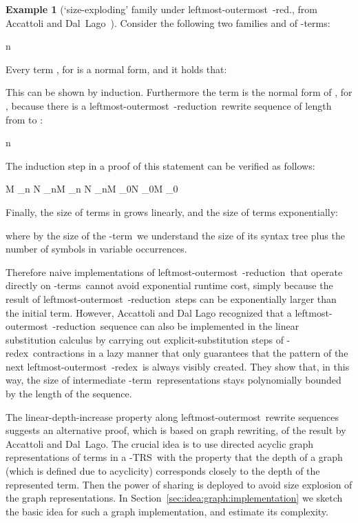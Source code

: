 \documentclass[
submission
]{dmtcs-episciences-tampered}
\newcommand{\indap}[2]{#1 _{#2}}
\newcommand{\bpap}[3]{#1 _{#2}^{#3}}
\newcommand{\nb}{\nobreakdash}
\newcommand{\nf}{\normalfont}
\newcommand{\nat}{\mathbb{N}}
\newcommand{\TRS}{TRS}
\newcommand{\alter}{M}
\newcommand{\blter}{N}
\newcommand{\alteri}{\indap{\alter}}
\newcommand{\blteri}{\indap{\blter}}
\newcommand{\sred}{\to}
\newcommand{\sredin}[2]{\bpap{\sred}{#1}{#2}}
\newcommand{\scriptlobeta}{\text{\nf lo}\beta}
\newcommand{\slobetaredn}{\sredin{\scriptlobeta}}
\newcommand{\lobetaredn}[1]{\mathrel{\slobetaredn{#1}}}
\newcommand{\lambdaterm}{\nb-term}
\newcommand{\lambdaterms}{\lambdaterm{s}}
\newcommand{\betareduction}{\nb-re\-duc\-tion}
\newcommand{\betaredex}{\nb-re\-dex}
\newcommand{\lo}{left\-most-outer\-most}
\newcommand{\lTRS}{\hspace*{-0.5pt}\nb-\hspace*{-0.5pt}\TRS}
\theoremstyle{plain}
\theoremstyle{definition}
\newtheorem{example}[theorem]{Example}
\begin{document}
\begin{example}[`size-exploding' family under \lo\ -red., from Accattoli and \mbox{Dal~Lago~\cite{acca:lago:2014:beta-reduction-invariant:LICS,acca:lago:2016}}] 
    \label{expl:lo:size:exploding:family}
  Consider the following two families  and  of \lambdaterms:  
  \begin{center}
    n\in\natn\in\nat
  \end{center}
  Every term , for  is a normal form, and it holds that:
  
  This can be shown by induction.
  Furthermore the term  is the normal form of , for ,
  because there is a \lo\ \betareduction\ rewrite sequence of length~ from  to :
  \begin{center}
    n\in\nat  
  \end{center}
  The induction step in a proof of this statement can be verified as follows:
  \begin{center}
    \alteri{n} \lobetaredn{n} \blteri{n}\alteri{n} \lobetaredn{n} \blteri{n}\alteri{0}\blteri{0}\alteri{0}
  \end{center}
  Finally, the size of terms in  grows linearly,
  and the size of terms  exponentially: 
  \begin{center}
    
  \end{center}
  where by the size of the \lambdaterm\ we understand the size of its syntax tree plus the number of symbols in variable occurrences.   
\end{example}


Therefore naive implementations of \lo\ \betareduction\ that operate
directly on \lambdaterms\ cannot avoid exponential runtime cost, simply because the result
of  \lo\ \betareduction\ steps can be exponentially larger than the initial term.
However, Accattoli and Dal Lago recognized that a \lo\ \betareduction\ sequence 
can also be implemented in the linear substitution calculus
by carrying out explicit-substitution steps of \betaredex\ contractions in a lazy manner
that only guarantees that the pattern of the next \lo\ \betaredex\ is always visibly created. 
They show that, in this way, the size of intermediate \lambdaterm\ representations stays 
polynomially bounded by the length of the sequence. 

The linear-depth-increase property along \lo\ rewrite sequences suggests 
an alternative proof, which is based on graph rewriting, of the result by Accattoli and Dal~Lago.
The crucial idea is to use directed acyclic graph representations of terms in a \lTRS\
with the property that the depth of a graph (which is defined due to acyclicity) corresponds closely to the depth of the represented term. 
Then the power of sharing is deployed to avoid size explosion of the graph representations.
In Section~\ref{sec:idea:graph:implementation} we sketch the basic idea for 
such a graph implementation, and estimate its complexity.
\end{document}
